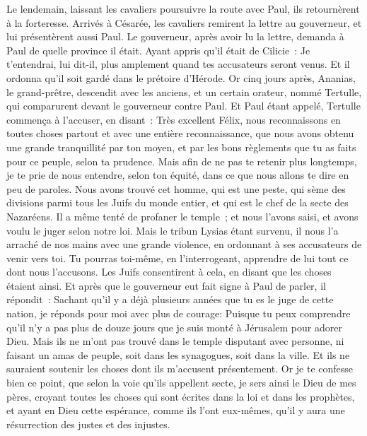 \begin{multicols}{2}
Le lendemain, laissant les cavaliers poursuivre la route avec Paul, ils retournèrent à la forteresse.
Arrivés à Césarée, les cavaliers remirent la lettre au gouverneur, et lui présentèrent aussi Paul.
Le gouverneur, après avoir lu la lettre, demanda à Paul de quelle province il était. Ayant appris qu'il était de Cilicie~:
Je t'entendrai, lui dit-il, plus amplement quand tes accusateurs seront venus. Et il ordonna qu'il soit gardé dans le prétoire d'Hérode.
\VerseOne{}Or cinq jours après, Ananias, le grand-prêtre, descendit avec les anciens, et un certain orateur, nommé Tertulle, qui comparurent devant le gouverneur contre Paul.
Et Paul étant appelé, Tertulle commença à l'accuser, en disant~:
Très excellent Félix, nous reconnaissons en toutes choses partout et avec une entière reconnaissance, que nous avons obtenu une grande tranquillité par ton moyen, et par les bons règlements que tu as faits pour ce peuple, selon ta prudence.
Mais afin de ne pas te retenir plus longtemps, je te prie de nous entendre, selon ton équité, dans ce que nous allons te dire en peu de paroles.
Nous avons trouvé cet homme, qui est une peste, qui sème des divisions parmi tous les Juifs du monde entier, et qui est le chef de la secte des Nazaréens.
Il a même tenté de profaner le temple~; et nous l'avons saisi, et avons voulu le juger selon notre loi.
Mais le tribun Lysias étant survenu, il nous l'a arraché de nos mains avec une grande violence,
en ordonnant à ses accusateurs de venir vers toi. Tu pourras toi-même, en l'interrogeant, apprendre de lui tout ce dont nous l'accusons.
Les Juifs consentirent à cela, en disant que les choses étaient ainsi.
Et après que le gouverneur eut fait signe à Paul de parler, il répondit~: Sachant qu'il y a déjà plusieurs années que tu es le juge de cette nation, je réponds pour moi avec plus de courage:
Puisque tu peux comprendre qu'il n'y a pas plus de douze jours que je suis monté à Jérusalem pour adorer Dieu.
Mais ils ne m'ont pas trouvé dans le temple disputant avec personne, ni faisant un amas de peuple, soit dans les synagogues, soit dans la ville.
Et ils ne sauraient soutenir les choses dont ils m'accusent présentement.
Or je te confesse bien ce point, que selon la voie qu'ils appellent secte, je sers ainsi le Dieu de mes pères, croyant toutes les choses qui sont écrites dans la loi et dans les prophètes,
et ayant en Dieu cette espérance, comme ils l'ont eux-mêmes, qu'il y aura une résurrection des justes et des injustes.

\end{multicols}
